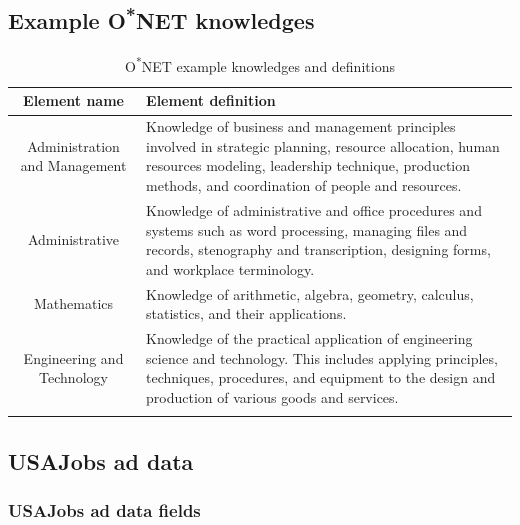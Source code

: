 \documentclass[12pt]{article}
\begin{document}
\subsection{Example O\textsuperscript{*}NET knowledges}

\begin{table}[ht!]
    \centering
    \vspace*{4mm}
    \begin{tabular}{c | >{\RaggedRight} m{10cm}} 
        \Xhline{3\arrayrulewidth}
        Element name & Element definition \\\hline\hline
        Administration and Management & Knowledge of business and management principles involved in strategic planning, resource allocation, human resources modeling, leadership technique, production methods, and coordination of people and resources. \\
        Administrative & Knowledge of administrative and office procedures and systems such as word processing, managing files and records, stenography and transcription, designing forms, and workplace terminology. \\
        Mathematics & Knowledge of arithmetic, algebra, geometry, calculus, statistics, and their applications. \\
        Engineering and Technology & Knowledge of the practical application of engineering science and technology. This includes applying principles, techniques, procedures, and equipment to the design and production of various goods and services. \\
        \Xhline{3\arrayrulewidth}
    \end{tabular}
    \caption{O\textsuperscript{*}NET example knowledges and definitions}\label{tab:knowledge_examples}
\end{table}

\newpage

\subsection{USAJobs ad data}

\subsubsection{USAJobs ad data fields}
\end{document}
